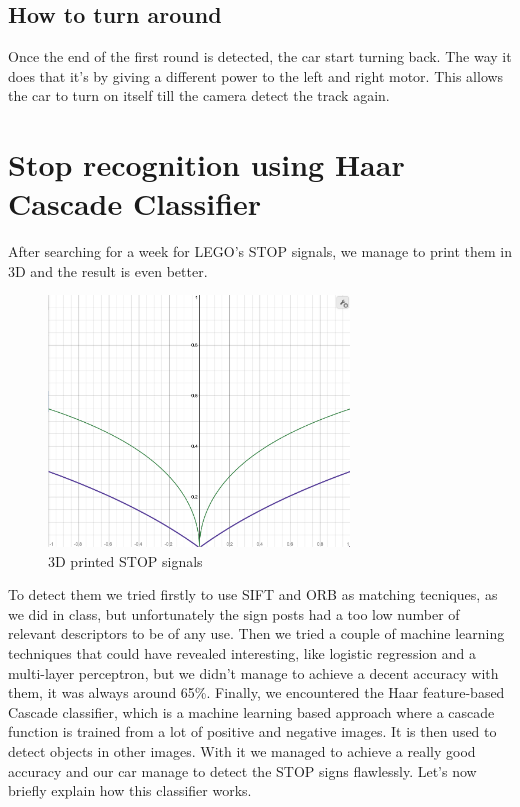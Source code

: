 \documentclass[12pt,a4paper]{article}
\begin{document}
\begin{large}
\subsection{How to turn around}
Once the end of the first round is detected, the car start turning back. The way it does that it's by giving a different power to the left and right motor. This allows the car to turn on itself till the camera detect the track again.\\


\section{Stop recognition using Haar Cascade Classifier}
After searching for a week for LEGO's STOP signals, we manage to print them in 3D and the result is even better.\par
\begin{figure} [!h]
  \centering
  \captionsetup{justification=centering}
  \includegraphics[width=8cm]{images/logx.png}
  \caption{3D printed STOP signals}
  \end{figure}
To detect them we tried firstly to use SIFT and ORB as matching tecniques, as we did in class, but unfortunately the sign posts had a too low number of relevant descriptors to be of any use.
Then we tried a couple of machine learning techniques that could have revealed interesting, like logistic regression and a multi-layer perceptron, but we didn't manage to achieve a decent accuracy with them, it was always around 65\%.
Finally, we encountered the Haar feature-based Cascade classifier, which is a machine learning based approach where a cascade function is trained from a lot of positive and negative images. It is then used to detect objects in other images. With it we managed to achieve a really good accuracy and our car manage to detect the STOP signs flawlessly. Let's now briefly explain how this classifier works.

\end{large}
\end{document}
